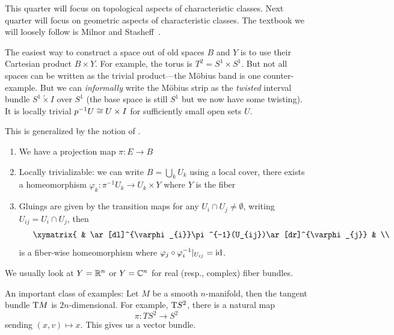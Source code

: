 
\lecture{}

\begin{node}
This quarter will focus on topological aspects of characteristic
classes. Next quarter will focus on geometric aspects of
characteristic classes. The textbook we will loosely follow is Milnor
and Stasheff~\cite{milnor1974characteristic}.
\end{node}

\begin{node}
The easiest way to construct a space out of old spaces $B$ and $Y$ is
to use their Cartesian product $B\times Y$. For example, the torus is
$T^{2}=S^{1}\times S^{1}$. But not all spaces can be written as the
trivial product---the M\"{o}bius band is one counter-example. But we
can \emph{informally} write the M\"{o}bius strip as the \emph{twisted}
interval bundle $S^{1}\widetilde{\times}I$ over $S^{1}$ (the base
space is still $S^{1}$ but we now have some twisting). It is locally
trivial $p^{-1}U\cong U\times I$ for sufficiently small open sets
$U$.

This is generalized by the notion of .
\begin{enumerate}
\item We have a projection map $\pi\colon E\to B$
\item Locally trivializable: we can write $B=\bigcup_{k}U_{k}$ using a
  local cover, there exists a homeomorphism
  $\varphi_{k}\colon\pi^{-1}U_{k}\to U_{k}\times Y$ where $Y$ is the fiber
\item Gluings are given by the transition maps for any $U_{i}\cap U_{j}\neq\emptyset$,
  writing $U_{ij}=U_{i}\cap U_{j}$, then
\begin{equation}
\vcenter{\xymatrix{ & \ar[dl]^{\varphi_{i}}\pi^{-1}(U_{ij})\ar[dr]^{\varphi_{j}} & \\
U_{ij}\times Y\subset U_{i}\times Y\ar[rr]^{\varphi_{j}\circ\varphi_{i}^{-1}}& &
U_{ij}\times Y\subset U_{j}\times Y}}
\end{equation}
is a fiber-wise homeomorphism where $\varphi_{j}\circ\varphi_{i}^{-1}|_{U_{ij}}=\operatorname{id}$.
\end{enumerate}
We usually look at $Y=\mathbb{R}^{n}$ or $Y=\mathbb{C}^{n}$ for real (resp.,
complex) fiber bundles.
\end{node}

\begin{node}
An important class of examples: Let $M$ be a smooth $n$-manifold, then
the tangent bundle $\mathrm{T} M$ is $2n$-dimensional. For example, $\mathrm{T} S^{2}$,
there is a natural map
\begin{equation}
\pi\colon TS^{2}\to S^{2}
\end{equation}
sending $(x,v)\mapsto x$. This gives us a vector bundle.
\end{node}

